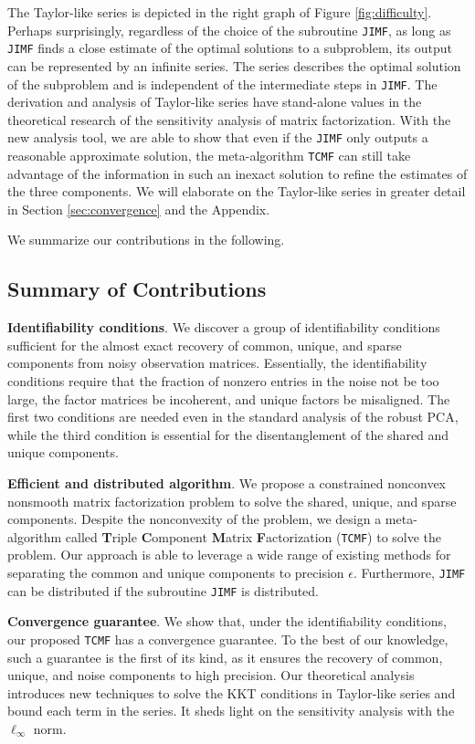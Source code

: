 \documentclass[twoside,11pt]{article}
\def\name{\texttt{TCMF}\xspace}
\def\inneralg{\texttt{JIMF}\xspace}
\begin{document}
The Taylor-like series is depicted in the right graph of Figure \ref{fig:difficulty}. Perhaps surprisingly, regardless of the choice of the subroutine \inneralg, as long as \inneralg finds a close estimate of the optimal solutions to a subproblem, its output can be represented by an infinite series. The series describes the optimal solution of the subproblem and is independent of the intermediate steps in \inneralg. The derivation and analysis of Taylor-like series have stand-alone values in the theoretical research of the sensitivity analysis of matrix factorization. With the new analysis tool, we are able to show that even if the \inneralg only outputs a reasonable approximate solution, the meta-algorithm \name can still take advantage of the information in such an inexact solution to refine the estimates of the three components. We will elaborate on the Taylor-like series in greater detail in Section \ref{sec:convergence} and the Appendix.


We summarize our contributions in the following.

\subsection{Summary of Contributions}

\textbf{Identifiability conditions}. We discover a group of identifiability conditions sufficient for the almost exact recovery of common, unique, and sparse components from noisy observation matrices. Essentially, the identifiability conditions require that the fraction of nonzero entries in the noise not be too large, the factor matrices be incoherent, and unique factors be misaligned. The first two conditions are needed even in the standard analysis of the robust PCA, while the third condition is essential for the disentanglement of the shared and unique components.


\textbf{Efficient and distributed algorithm}. We propose a constrained nonconvex nonsmooth matrix factorization problem to solve the shared, unique, and sparse components. Despite the nonconvexity of the problem, we design a meta-algorithm called \textbf{T}riple \textbf{C}omponent \textbf{M}atrix \textbf{F}actorization (\name) to solve the problem. Our approach is able to leverage a wide range of existing methods for separating the common and unique components to precision $\epsilon$. Furthermore, \inneralg can be distributed if the subroutine \inneralg is distributed.

\textbf{Convergence guarantee}. We show that, under the identifiability conditions, our proposed \name has a convergence guarantee. To the best of our knowledge, such a guarantee is the first of its kind, as it ensures the recovery of common, unique, and noise components to high precision. Our theoretical analysis introduces new techniques to solve the KKT conditions in Taylor-like series and bound each term in the series. It sheds light on the sensitivity analysis with the $\ell_{\infty}$ norm.
\end{document}
